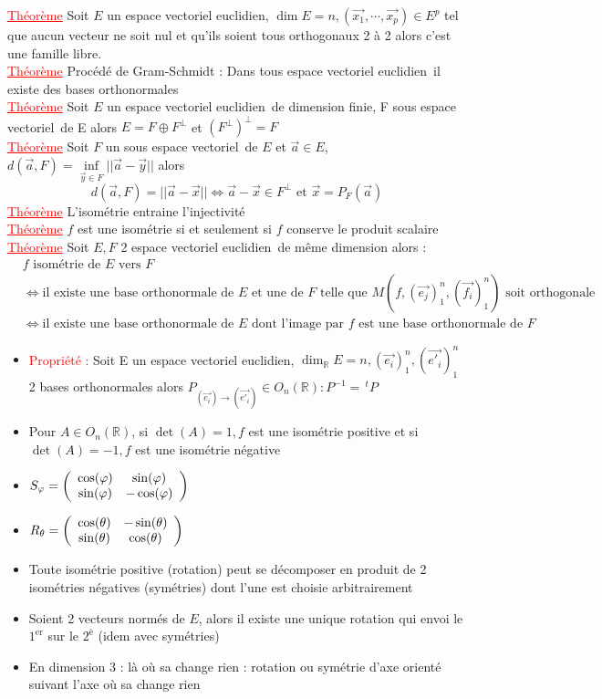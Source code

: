 \documentclass[a4paper, french]{article}
\newcommand{\R}{\mathbb{R}}
\newcommand{\ev}{espace vectoriel}
\newcommand{\eve}{espace vectoriel euclidien}
\newcommand{\te}{\theta}
\newcommand{\ph}{\varphi}
\newcommand{\thm}{\textcolor{red}{\underline{Théorème} }}
\newcommand{\ppt}{\textcolor{red}{Propriété : }}
\begin{document}
	  \thm Soit $E$  un \eve, $\dim E=n, (\vec{x_1},\cdots,\vec{x_p}) \in E^p$ tel que aucun vecteur ne soit nul et qu'ils soient tous orthogonaux 2 à 2 alors c'est une famille libre. \\
	  \thm Procédé de Gram-Schmidt : Dans tous  \eve \, il existe des bases orthonormales \\
	  \thm Soit $E$ un \eve \, de dimension finie, F sous \ev\, de E alors $E=F\oplus F^{\perp}$ et $(F^{\perp})^{\perp}=F$ \\
	  \thm Soit $F$ un sous \ev \, de $E$ et $\vec{a} \in E$, $d(\vec{a},F)=\underset{\vec{y} \in F}\inf ||\vec{a}-\vec{y}||$ alors $$d(\vec{a},F)=||\vec{a}-\vec{x}|| \iff \vec{a}-\vec{x} \in F^{\perp} \text{ et }\vec{x}=P_F(\vec{a})$$
	  \thm L'isométrie entraine l'injectivité \\
	  \thm $f$ est une isométrie si et seulement si $f$ conserve le produit scalaire \\
	  \thm Soit $E,F$ 2 \eve \, de même dimension alors :
			 \begin{align*}
				 &f \text{ isométrie de $E$ vers $F$} \\
				 &\iff \text{il existe une base orthonormale de $E$ et une de $F$ telle que $M(f,(\vec{e_j})_1^n,(\vec{f_i})_1^n)$ soit orthogonale} \\
				 &\iff \text{il existe une base orthonormale de $E$ dont l'image par $f$ est une base orthonormale de $F$}
			 \end{align*}
	 \begin{itemize}
		  \item \ppt Soit E un \eve, $\dim_{\R}E=n, (\vec{e_i})_1^n,(\vec{e'_i})_1^n$ 2 bases orthonormales alors $P_{(\vec{e_i}) \rightarrow (\vec{e'_i})} \in O_n(\R) : P^{-1}=\,^tP$
		  \item Pour $A \in O_n(\R)$, si $\det(A)=1, f$ est une isométrie positive et si $\det(A)=-1,f$ est une isométrie négative
		  \item $S_\ph=\left( \begin{array}{c c} \cos(\ph) & \sin(\ph) \\ \sin(\ph) & -\cos(\ph) \end{array} \right)$
		  \item $R_\te=\left( \begin{array}{c c} \cos(\te) & -\sin(\te) \\ \sin(\te) & \cos(\te) \end{array} \right)$
		  \item Toute isométrie positive (rotation) peut se décomposer en produit de 2 isométries négatives (symétries) dont l'une est choisie arbitrairement
		 \item Soient 2 vecteurs normés de $E$, alors il existe une unique rotation qui envoi le $1^{\text{er}}$ sur le $2^{\text{è}}$ (idem avec symétries)
		 \item En dimension 3 : là où sa change rien : rotation ou symétrie d'axe orienté suivant l'axe où sa change rien
	 \end{itemize}
	 
\end{document}
